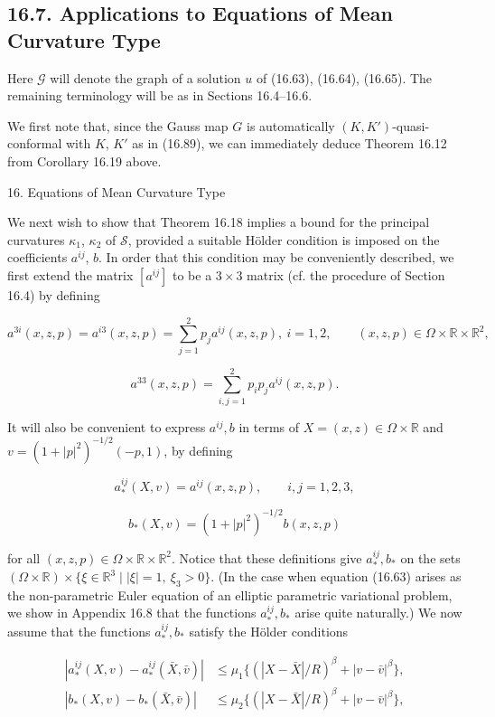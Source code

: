 \subsection*{16.7. Applications to Equations of Mean Curvature Type}

Here $\mathscr{G}$ will denote the graph of a solution $u$ of (16.63), (16.64), (16.65). The
remaining terminology will be as in Sections 16.4--16.6.

We first note that, since the Gauss map $G$ is automatically $(K,K')$-quasi-
conformal with $K$, $K'$ as in (16.89), we can immediately deduce Theorem 16.12 from
Corollary 16.19 above.



\setcounter{page}{430}

16. Equations of Mean Curvature Type

We next wish to show that Theorem 16.18 implies a bound for the principal
curvatures $\kappa_1$, $\kappa_2$ of $\mathcal{S}$, provided a suitable H\"older condition is imposed on the
coefficients $a^{ij}$, $b$. In order that this condition may be conveniently described, we
first extend the matrix $[a^{ij}]$ to be a $3\times 3$ matrix (cf. the procedure of Section 16.4)
by defining

\[
a^{3i}(x,z,p)=a^{i3}(x,z,p)=\sum_{j=1}^{2} p_j a^{ij}(x,z,p),\ i=1,2,
\qquad (x,z,p)\in\Omega\times\mathbb{R}\times\mathbb{R}^2,
\]

\[
a^{33}(x,z,p)=\sum_{i,j=1}^{2} p_i p_j a^{ij}(x,z,p).
\]

It will also be convenient to express $a^{ij}, b$ in terms of $X=(x,z)\in\Omega\times\mathbb{R}$ and
$v=(1+|p|^2)^{-1/2}(-p,1)$, by defining

\[
a_*^{ij}(X,v)=a^{ij}(x,z,p), \qquad i,j=1,2,3,
\]

\[
b_*(X,v)=(1+|p|^2)^{-1/2}b(x,z,p)
\]

for all $(x,z,p)\in\Omega\times\mathbb{R}\times\mathbb{R}^2$. Notice that these definitions give $a_*^{ij}, b_*$ on the sets
$(\Omega\times\mathbb{R})\times\{ \xi\in\mathbb{R}^3 \mid |\xi|=1,\ \xi_3>0\}$. (In the case when equation (16.63) arises as the
non-parametric Euler equation of an elliptic parametric variational problem, we
show in Appendix 16.8 that the functions $a_*^{ij}, b_*$ arise quite naturally.) We now
assume that the functions $a_*^{ij}, b_*$ satisfy the H\"older conditions

\begin{equation}
\begin{aligned}
\left|a_*^{ij}(X,v)-a_*^{ij}(\bar X,\bar v)\right| &\le \mu_1\{(|X-\bar X|/R)^\beta+|v-\bar v|^\beta\},\\
\left|b_*(X,v)-b_*(\bar X,\bar v)\right| &\le \mu_2\{(|X-\bar X|/R)^\beta+|v-\bar v|^\beta\},
\end{aligned}
\tag{16.103}
\end{equation}

